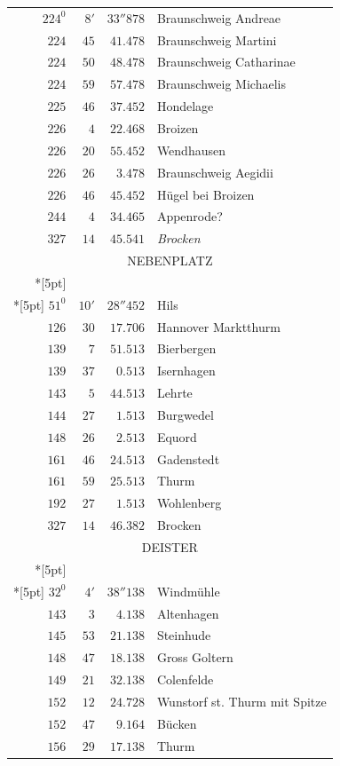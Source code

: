 \clearpage
{}%
\begingroup
\fontsize{10.5}{13}\selectfont
\setlength{\tabcolsep}{3pt}
\setlength{\LTpre}{2pt}
\setlength{\LTpost}{2pt}
\begin{longtable}{@{}rrrp{.61\linewidth}@{}}
\(224^{0}\)&\(8'\)&\(33''878\)&\raggedright Braunschweig Andreae\tabularnewline
\(224\)&\(45\)&\(41.478\)&\raggedright Braunschweig Martini\tabularnewline
\(224\)&\(50\)&\(48.478\)&\raggedright Braunschweig Catharinae\tabularnewline
\(224\)&\(59\)&\(57.478\)&\raggedright Braunschweig Michaelis\tabularnewline
\(225\)&\(46\)&\(37.452\)&\raggedright Hondelage\tabularnewline
\(226\)&\(4\)&\(22.468\)&\raggedright Broizen\tabularnewline
\(226\)&\(20\)&\(55.452\)&\raggedright Wendhausen\tabularnewline
\(226\)&\(26\)&\(3.478\)&\raggedright Braunschweig Aegidii\tabularnewline
\(226\)&\(46\)&\(45.452\)&\raggedright Hügel bei Broizen\tabularnewline
\(244\)&\(4\)&\(34.465\)&\raggedright Appenrode?\tabularnewline
\(327\)&\(14\)&\(45.541\)&\raggedright \textit{Brocken}\tabularnewline
\multicolumn{4}{c}{\strut NEBENPLATZ}\\*[5pt]
\multicolumn{4}{c}{\(-66001.465\)\qquad\(-23458.558\)}\\*[5pt]
\(51^{0}\)&\(10'\)&\(28''452\)&\raggedright Hils\tabularnewline
\(126\)&\(30\)&\(17.706\)&\raggedright Hannover Marktthurm\tabularnewline
\(139\)&\(7\)&\(51.513\)&\raggedright Bierbergen\tabularnewline
\(139\)&\(37\)&\(0.513\)&\raggedright Isernhagen\tabularnewline
\(143\)&\(5\)&\(44.513\)&\raggedright Lehrte\tabularnewline
\(144\)&\(27\)&\(1.513\)&\raggedright Burgwedel\tabularnewline
\(148\)&\(26\)&\(2.513\)&\raggedright Equord\tabularnewline
\(161\)&\(46\)&\(24.513\)&\raggedright Gadenstedt\tabularnewline
\(161\)&\(59\)&\(25.513\)&\raggedright Thurm\tabularnewline
\(192\)&\(27\)&\(1.513\)&\raggedright Wohlenberg\tabularnewline
\(327\)&\(14\)&\(46.382\)&\raggedright Brocken\tabularnewline
\multicolumn{4}{c}{\strut DEISTER}\\*[5pt]
\multicolumn{4}{c}{\(-78478.377\)\qquad\(+23444.173\)}\\*[5pt]
\(32^{0}\)&\(4'\)&\(38''138\)&\raggedright Windmühle\tabularnewline
\(143\)&\(3\)&\(4.138\)&\raggedright Altenhagen\tabularnewline
\(145\)&\(53\)&\(21.138\)&\raggedright Steinhude\tabularnewline
\(148\)&\(47\)&\(18.138\)&\raggedright Gross Goltern\tabularnewline
\(149\)&\(21\)&\(32.138\)&\raggedright Colenfelde\tabularnewline
\(152\)&\(12\)&\(24.728\)&\raggedright Wunstorf st. Thurm mit Spitze\tabularnewline
\(152\)&\(47\)&\(9.164\)&\raggedright Bücken\tabularnewline
\(156\)&\(29\)&\(17.138\)&\raggedright Thurm\tabularnewline

\end{longtable}
